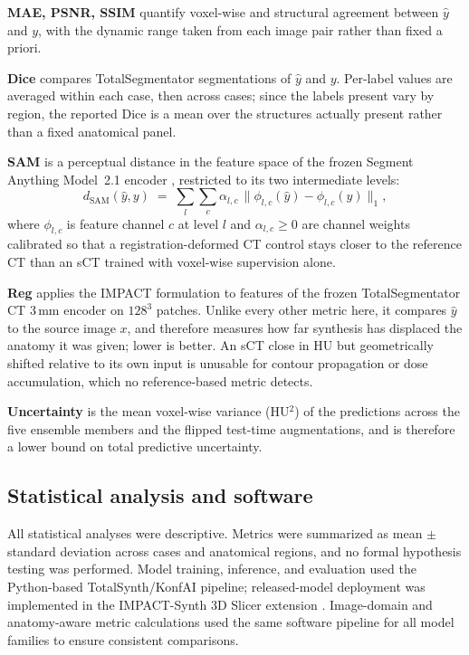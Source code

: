 \documentclass{article}
\begin{document}
\textbf{MAE, PSNR, SSIM} quantify voxel-wise and structural agreement between $\hat{y}$ and $y$, with the dynamic range taken from each image pair rather than fixed a priori.

\textbf{Dice} compares TotalSegmentator \cite{wasserthal2023totalsegmentator} segmentations of $\hat{y}$ and $y$. Per-label values are averaged within each case, then across cases; since the labels present vary by region, the reported Dice is a mean over the structures actually present rather than a fixed anatomical panel.

\textbf{SAM} is a perceptual distance in the feature space of the frozen Segment Anything Model~2.1 encoder \cite{ravi2025sam2}, restricted to its two intermediate levels:
\begin{equation}
d_{\mathrm{SAM}}(\hat{y},y) \;=\; \sum_{l}\sum_{c} \alpha_{l,c}\,\bigl\| \phi_{l,c}(\hat{y}) - \phi_{l,c}(y) \bigr\|_1 ,
\end{equation}
where $\phi_{l,c}$ is feature channel $c$ at level $l$ and $\alpha_{l,c}\geq0$ are channel weights calibrated so that a registration-deformed CT control stays closer to the reference CT than an sCT trained with voxel-wise supervision alone.

\textbf{Reg} applies the IMPACT formulation \cite{boussot2025impact} to features of the frozen TotalSegmentator CT 3\,mm encoder on $128^3$ patches. Unlike every other metric here, it compares $\hat{y}$ to the source image $x$, and therefore measures how far synthesis has displaced the anatomy it was given; lower is better. An sCT close in HU but geometrically shifted relative to its own input is unusable for contour propagation or dose accumulation, which no reference-based metric detects.

\textbf{Uncertainty} is the mean voxel-wise variance (HU$^2$) of the predictions across the five ensemble members and the flipped test-time augmentations, and is therefore a lower bound on total predictive uncertainty.

\subsection{Statistical analysis and software}

All statistical analyses were descriptive. Metrics were summarized as mean $\pm$ standard deviation across cases and anatomical regions, and no formal hypothesis testing was performed. Model training, inference, and evaluation used the Python-based TotalSynth/KonfAI pipeline; released-model deployment was implemented in the IMPACT-Synth 3D Slicer extension \cite{fedorov2012slicer}. Image-domain and anatomy-aware metric calculations used the same software pipeline for all model families to ensure consistent comparisons.
\end{document}
